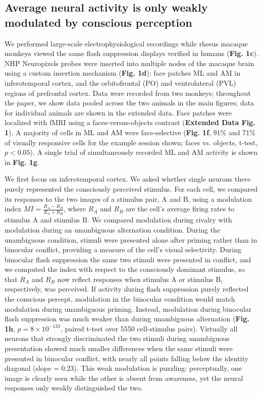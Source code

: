 \documentclass{article}
\begin{document}
\subsection*{Average neural activity is only weakly modulated by conscious perception}

We performed large-scale electrophysiological recordings while rhesus macaque monkeys viewed the same flash suppression displays verified in humans (\textbf{Fig. 1c}). NHP Neuropixels probes were inserted into multiple nodes of the macaque brain using a custom insertion mechanism (\textbf{Fig. 1d}): face patches ML and AM in inferotemporal cortex, and the orbitofrontal (PO) and ventrolateral (PVL) regions of prefrontal cortex. Data were recorded from two monkeys; throughout the paper, we show data pooled across the two animals in the main figures; data for individual animals are shown in the extended data. Face patches were localized with fMRI using a faces-versus-objects contrast (\textbf{Extended Data Fig. 1}). A majority of cells in ML and AM were face-selective (\textbf{Fig. 1f}, 91\% and 71\% of visually responsive cells for the example session shown; faces vs. objects, t-test, $p < 0.05$). A single trial of simultaneously recorded ML and AM activity is shown in \textbf{Fig. 1g}.

We first focus on inferotemporal cortex. We asked whether single neurons there purely represented the consciously perceived stimulus. For each cell, we compared its responses to the two images of a stimulus pair, A and B, using a modulation index $MI = \frac{R_A - R_B}{R_A + R_B}$, where $R_A$ and $R_B$ are the cell's average firing rates to stimulus A and stimulus B. We compared modulation during rivalry with modulation during an unambiguous alternation condition. During the unambiguous condition, stimuli were presented alone after priming rather than in binocular conflict, providing a measure of the cell's visual selectivity. During binocular flash suppression the same two stimuli were presented in conflict, and we computed the index with respect to the consciously dominant stimulus, so that $R_A$ and $R_B$ now reflect responses when stimulus A or stimulus B, respectively, was perceived. If activity during flash suppression purely reflected the conscious percept, modulation in the binocular condition would match modulation during unambiguous priming. Instead, modulation during binocular flash suppression was much weaker than during unambiguous alternation (\textbf{Fig. 1h}, $p = 8 \times 10^{-133}$, paired t-test over 5550 cell-stimulus pairs). Virtually all neurons that strongly discriminated the two stimuli during unambiguous presentation showed much smaller differences when the same stimuli were presented in binocular conflict, with nearly all points falling below the identity diagonal (slope = 0.23). This weak modulation is puzzling: perceptually, one image is clearly seen while the other is absent from awareness, yet the neural responses only weakly distinguished the two.
\end{document}
